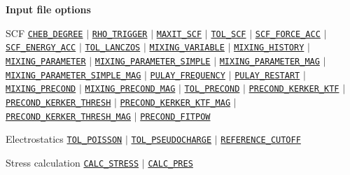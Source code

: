 \documentclass[xcolor=dvipsnames,t]{beamer}
\begin{document}
\begin{frame}[allowframebreaks]{\textbf{Input file options}}
\begin{block}{SCF}
\hyperlink{CHEB_DEGREE}{\texttt{CHEB\_DEGREE}} $\vert$ 
\hyperlink{RHO_TRIGGER}{\texttt{RHO\_TRIGGER}} $\vert$ 
\hyperlink{MAXIT_SCF}{\texttt{MAXIT\_SCF}} $\vert$ 
\hyperlink{TOL_SCF}{\texttt{TOL\_SCF}} $\vert$ 
\hyperlink{SCF_FORCE_ACC}{\texttt{SCF\_FORCE\_ACC}} $\vert$ 
\hyperlink{SCF_ENERGY_ACC}{\texttt{SCF\_ENERGY\_ACC}} $\vert$ 
\hyperlink{TOL_LANCZOS}{\texttt{TOL\_LANCZOS}} $\vert$ 
\hyperlink{MIXING_VARIABLE}{\texttt{MIXING\_VARIABLE}} $\vert$ 
\hyperlink{MIXING_HISTORY}{\texttt{MIXING\_HISTORY}} $\vert$ 
\hyperlink{MIXING_PARAMETER}{\texttt{MIXING\_PARAMETER}} $\vert$ 
\hyperlink{MIXING_PARAMETER_SIMPLE}{\texttt{MIXING\_PARAMETER\_SIMPLE}} $\vert$ 
\hyperlink{MIXING_PARAMETER_MAG}{\texttt{MIXING\_PARAMETER\_MAG}} $\vert$
\hyperlink{MIXING_PARAMETER_SIMPLE_MAG}{\texttt{MIXING\_PARAMETER\_SIMPLE\_MAG}} $\vert$
\hyperlink{PULAY_FREQUENCY}{\texttt{PULAY\_FREQUENCY}} $\vert$ 
\hyperlink{PULAY_RESTART}{\texttt{PULAY\_RESTART}} $\vert$ 
\hyperlink{MIXING_PRECOND}{\texttt{MIXING\_PRECOND}} $\vert$ 
\hyperlink{MIXING_PRECOND_MAG}{\texttt{MIXING\_PRECOND\_MAG}} $\vert$ 
\hyperlink{TOL_PRECOND}{\texttt{TOL\_PRECOND}} $\vert$ 
\hyperlink{PRECOND_KERKER_KTF}{\texttt{PRECOND\_KERKER\_KTF}} $\vert$ 
\hyperlink{PRECOND_KERKER_THRESH}{\texttt{PRECOND\_KERKER\_THRESH}} $\vert$ 
\hyperlink{PRECOND_KERKER_KTF_MAG}{\texttt{PRECOND\_KERKER\_KTF\_MAG}} $\vert$ 
\hyperlink{PRECOND_KERKER_THRESH\_MAG}{\texttt{PRECOND\_KERKER\_THRESH\_MAG}} $\vert$ 
\hyperlink{PRECOND_FITPOW}{\texttt{PRECOND\_FITPOW}}
\end{block}

\vspace{-2mm}
\begin{block}{Electrostatics}
\hyperlink{TOL_POISSON}{\texttt{TOL\_POISSON}} $\vert$ \hyperlink{TOL_PSEUDOCHARGE}{\texttt{TOL\_PSEUDOCHARGE}} $\vert$ \hyperlink{REFERENCE_CUTOFF}{\texttt{REFERENCE\_CUTOFF}}
\end{block}

\vspace{-2mm}
\begin{block}{Stress calculation}
\hyperlink{CALC_STRESS}{\texttt{CALC\_STRESS}} $\vert$ \hyperlink{CALC_PRES}{\texttt{CALC\_PRES}}
\end{block}
\vspace{-2mm}


\end{frame}
\end{document}
